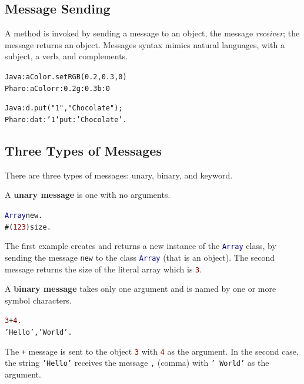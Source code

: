 \documentclass[notumble]{leaflet}
\makeatletter
\newenvironment{displaycode}{%
     \par
     \hspace{1.5em}\begin{minipage}{\linewidth}
       \begin{alltt}\small}{
       \end{alltt}
     \end{minipage}
     \par}
\newcommand{\code}[1]{\foreignlanguage{english}{\texttt{#1}}}
\makeatother
\begin{document}

\subsection{Message Sending}

A method is invoked by sending a message to an object, the message
\emph{receiver}; the message returns an object. Messages syntax mimics
natural languages, with a subject, a verb, and complements. 

\begin{displaycode}
Java: aColor.setRGB(0.2,0.3,0)  
Pharo: aColor r: 0.2 g: 0.3 b: 0 
\end{displaycode}

\begin{displaycode}
Java: d.put("1", "Chocolate"); 
Pharo: d at: '1' put: 'Chocolate'.
\end{displaycode}

\subsection{Three Types of Messages}
There
are three types of messages: unary, binary, and keyword.

A \textbf{unary message} is one with no arguments.

\begin{displaycode}
\textcolor{darkBlue}{Array} new.
#(\textcolor{darkRed}{1 2 3}) size.
\end{displaycode}

The first example creates and returns a new instance of the
\textcolor{darkBlue}{\code{Array}} class, by sending the message \code{new} to the class
\textcolor{darkBlue}{\code{Array}} (that is an object). The second message returns the size
of the literal array which is \textcolor{darkRed}{\code{3}}.

A \textbf{binary message} takes only one
argument and is named by one or more symbol characters.

\begin{displaycode}
\textcolor{darkRed}{3} + \textcolor{darkRed}{4}.
\textcolor{string}{'Hello'}, \textcolor{string}{' World'}.
\end{displaycode}

The \code{+} message is sent to the object
\textcolor{darkRed}{\code{3}} with \textcolor{darkRed}{\code{4}} as
the argument. In the second case, the string
\textcolor{string}{\code{'Hello'}} receives the message \code{,}
(comma) with \textcolor{string}{\code{'~World'}} as the argument.
\end{document}
